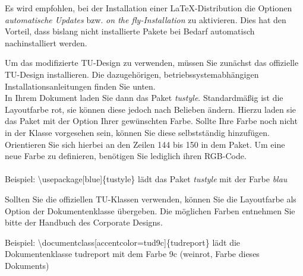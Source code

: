 Es wird empfohlen, bei der Installation einer \LaTeX-Distribution die Optionen \emph{automatische Updates} bzw. \emph{on the fly-Installation} zu aktivieren. Dies hat den Vorteil, dass bislang nicht installierte Pakete bei Bedarf automatisch nachinstalliert werden.

Um das modifizierte TU-Design zu verwenden, müssen Sie zunächst das offizielle TU-Design installieren. Die dazugehörigen, betriebssystemabhängigen Installationsanleitungen finden Sie unten.\\
In Ihrem Dokument laden Sie dann das Paket \emph{tustyle}. Standardmäßig ist die Layoutfarbe rot, sie können diese jedoch nach Belieben ändern. Hierzu laden sie das Paket mit der Option Ihrer gewünschten Farbe. Sollte Ihre Farbe noch nicht in der Klasse vorgesehen sein, können Sie diese selbstständig hinzufügen. Orientieren Sie sich hierbei an den Zeilen 144 bis 150 in dem Paket. Um eine neue Farbe zu definieren, benötigen Sie lediglich ihren RGB-Code.\\ \\
Beispiel: \textbackslash usepackage[blue]\{tustyle\} lädt das Paket \emph{tustyle} mit der Farbe \emph{blau}

Sollten Sie die offiziellen TU-Klassen verwenden, können Sie die Layoutfarbe als Option der Dokumentenklasse übergeben. Die möglichen Farben entnehmen Sie bitte der Handbuch des Corporate Designs.

Beispiel: \textbackslash documentclass[accentcolor=tud9c]\{tudreport\} lädt die Dokumentenklasse tudreport mit dem Farbe 9c (weinrot, Farbe dieses Dokuments)

